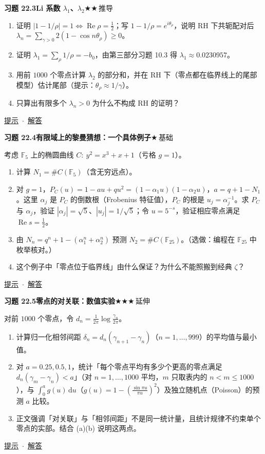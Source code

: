 \documentclass[11pt,a4paper]{article}
\newcommand{\dd}{\,\mathrm{d}}
\renewcommand{\Re}{\operatorname{Re}}
\newcommand{\lvI}{$\bigstar$\,基础}
\newcommand{\lvII}{$\bigstar\bigstar$\,推导}
\newcommand{\lvIII}{$\bigstar\bigstar\bigstar$\,延伸}
\newcommand{\Q}[3]{%
  \par\addvspace{1.1em}\noindent
  \hypertarget{q:#1}{}\textbf{习题 #1}\quad\textbf{#3}\hfill{\small #2}\par
  \nopagebreak\smallskip}
\newcommand{\toHint}[1]{\hfill{\small\hyperlink{h:#1}{提示}\ $\cdot$\ \hyperlink{s:#1}{解答}}}
\begin{document}
\Q{22.3}{\lvII}{Li 系数 $\lambda_1$、$\lambda_2$}
\begin{enumerate}
  \item 证明 $|1-1/\rho|=1\iff\Re\rho=\frac12$；写 $1-1/\rho=e^{i\theta_\rho}$，说明 RH 下共轭配对后 $\lambda_n=\sum_{\gamma>0}2(1-\cos n\theta_\rho)\ge0$。
  \item 证明 $\lambda_1=\sum_\rho1/\rho=-b_0$，由第三部分习题 10.3 得 $\lambda_1\approx0.0230957$。
  \item 用前 $1000$ 个零点计算 $\lambda_2$ 的部分和，并在 RH 下（零点都在临界线上的尾部模型）估计尾部（提示：$\theta_\rho\approx1/\gamma$）。
  \item 只算出有限多个 $\lambda_n>0$ 为什么不构成 RH 的证明？
\end{enumerate}
\toHint{22.3}

\Q{22.4}{\lvI}{有限域上的黎曼猜想：一个具体例子}
考虑 $\mathbb F_5$ 上的椭圆曲线 $C:\ y^2=x^3+x+1$（亏格 $g=1$）。
\begin{enumerate}
  \item 计算 $N_1=\#C(\mathbb F_5)$（含无穷远点）。
  \item 对 $g=1$，$P_C(u)=1-au+qu^2=(1-\alpha_1u)(1-\alpha_2u)$，$a=q+1-N_1$。这里 $\alpha_j$ 是 $P_C$ 的倒数根（Frobenius 特征值），$P_C$ 的根是 $u_j=\alpha_j^{-1}$。求 $P_C$ 与 $\alpha_j$，验证 $|\alpha_j|=\sqrt5$、$|u_j|=1/\sqrt5$；令 $u=5^{-s}$，验证相应零点满足 $\Re s=\frac12$。
  \item 由 $N_n=q^n+1-(\alpha_1^n+\alpha_2^n)$ 预测 $N_2=\#C(\mathbb F_{25})$。（选做：编程在 $\mathbb F_{25}$ 中枚举核对。）
  \item 这个例子中「零点位于临界线」由什么保证？为什么不能照搬到经典 $\zeta$？
\end{enumerate}
\toHint{22.4}

\Q{22.5}{\lvIII}{零点的对关联：数值实验}
对前 $1000$ 个零点，令 $d_n=\frac1{2\pi}\log\frac{\gamma_n}{2\pi}$。
\begin{enumerate}
  \item 计算归一化相邻间距 $\delta_n=d_n(\gamma_{n+1}-\gamma_n)$（$n=1,\dots,999$）的平均值与最小值。
  \item 对 $a=0.25,0.5,1$，统计「每个零点平均有多少个更高的零点满足 $d_n(\gamma_m-\gamma_n)<a$」（对 $n=1,\dots,1000$ 平均，$m$ 只取表内的 $n<m\le1000$），与 $\int_0^ag(u)\dd u$（$g(u)=1-(\frac{\sin\pi u}{\pi u})^2$）及独立随机点（Poisson）的预测 $a$ 比较。
  \item 正文强调「对关联」与「相邻间距」不是同一统计量，且统计规律不约束单个零点的实部。结合 (a)(b) 说明这两点。
\end{enumerate}
\toHint{22.5}
\end{document}
